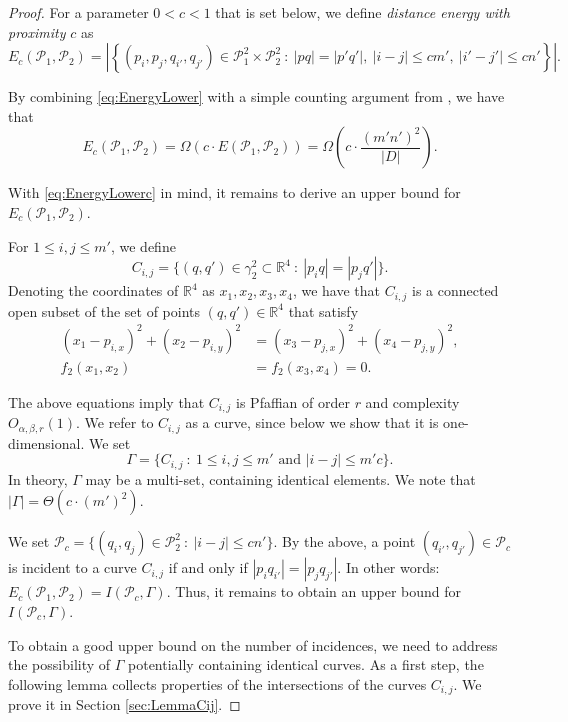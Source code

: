 \documentclass[11pt]{article}
\theoremstyle{definition}
\newcommand{\parag}[1]{\vspace{2mm}
\noindent{\bf #1} }
\newcommand{\RR}{\mathbb R}
\newcommand{\pts}{\mathcal{P}}
\newcommand{\curves}{\Gamma}
\begin{document}
\begin{proof}
For a parameter $0<c<1$ that is set below, we define
\emph{distance energy with proximity} $c$ as 
\[ E_c(\pts_1,\pts_2) = \left|\left\{(p_i,p_j,q_{i'},q_{j'})\in \pts_1^2\times \pts_2^2\ :\ |pq|=|p'q'|,\ |i-j|\le cm',\ |i'-j'|\le cn' \right\}\right|.\]

By combining \eqref{eq:EnergyLower} with a simple counting argument from \cite[Section 2]{SolyZahl24}, we have that
\begin{equation} \label{eq:EnergyLowerc} E_c(\pts_1,\pts_2) =\Omega(c \cdot E(\pts_1,\pts_2)) = \Omega\left(c\cdot \frac{(m'n')^2}{|D|}\right). 
\end{equation}

With \eqref{eq:EnergyLowerc} in mind, it remains to derive an upper bound for $E_c(\pts_1,\pts_2)$.

\parag{Point-curve incidences.}
For $1\le i,j\le m'$, we define
\begin{equation} \label{eq:Cij} 
C_{i,j} = \{(q,q')\in \gamma_2^2 \subset\RR^4\ :\ |p_i q| = |p_jq'| \}. 
\end{equation}
Denoting the coordinates of $\RR^4$ as $x_1,x_2,x_3,x_4$, we have that
$C_{i,j}$ is a connected open subset of the set of points $(q,q')\in \RR^4$ that satisfy
%
\begin{align*}
 (x_1-p_{i,x})^2 + (x_2-p_{i,y})^2 &= (x_3-p_{j,x})^2 + (x_4-p_{j,y})^2, \nonumber \\[2mm]
  f_2(x_1,x_2) &= f_2(x_3,x_4)=0. 
  \end{align*}

The above equations imply that $C_{i,j}$ is Pfaffian of order $r$ and complexity $O_{\alpha,\beta,r}(1)$.
We refer to $C_{i,j}$ as a curve, since below we show that it is one-dimensional. 
We set 
%
\[ \curves = \{ C_{i,j}\ :\ 1\leq i,j \leq m' \text{ and } |i-j|\le m'c\}.\]
%
In theory, $\curves$ may be a multi-set, containing identical elements.
We note that $|\curves| =\Theta(c\cdot (m')^2)$. 

We set $\pts_c = \{(q_i,q_j)\in \pts_2^2\ :\ |i-j|\le cn'\}$.
By the above, a point $(q_{i'},q_{j'})\in \pts_c$ is incident to a curve $C_{i,j}$ if and only if $|p_i q_{i'}| = |p_jq_{j'}|$.
In other words: $E_c(\pts_1,\pts_2)= I(\pts_c,\curves)$. 
Thus, it remains to obtain an upper bound for $I(\pts_c,\curves)$.

To obtain a good upper bound on the number of incidences, we need to address the possibility of $\curves$ potentially containing identical curves.
As a first step, the following lemma collects properties of the intersections of the curves $C_{i,j}$. 
We prove it in Section \ref{sec:LemmaCij}.


\end{proof}
\end{document}
